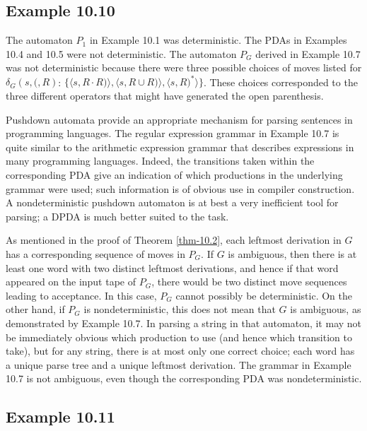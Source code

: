 \subsection*{Example 10.10}

The automaton $P_1$ in Example 10.1 was deterministic. The PDAs in Examples 10.4
and 10.5 were not deterministic. The automaton $P_G$ derived in Example 10.7 was
not deterministic because there were three possible choices of moves listed
for $\delta_G(s,\pmb{(}, R)$: $\{\langle s,R\cdot R\pmb{)}\rangle,\langle s,R
\cup R\pmb{)}\rangle,\langle s,R\pmb{)^*}\rangle\}$. These choices corresponded
to the three different operators that might have generated the open parenthesis.

Pushdown automata provide an appropriate mechanism for parsing sentences in
programming languages. The regular expression grammar in Example 10.7 is quite
similar to the arithmetic expression grammar that describes expressions in many
programming languages. Indeed, the transitions taken within the corresponding
PDA give an indication of which productions in the underlying grammar were used;
such information is of obvious use in compiler construction. A nondeterministic
pushdown automaton is at best a very inefficient tool for parsing; a DPDA is
much better suited to the task.

As mentioned in the proof of Theorem \ref{thm-10.2}, each leftmost derivation in $G$ has
a corresponding sequence of moves in $P_G$. If $G$ is ambiguous, then there is at
least one word with two distinct leftmost derivations, and hence if that word
appeared on the input tape of $P_G$, there would be two distinct move sequences
leading to acceptance. In this case, $P_G$ cannot possibly be deterministic. On
the other hand, if $P_G$ is nondeterministic, this does not mean that $G$ is
ambiguous, as demonstrated by Example 10.7. In parsing a string in that
automaton, it may not be immediately obvious which production to use (and hence
which transition to take), but for any string, there is at most only one correct
choice; each word has a unique parse tree and a unique leftmost derivation. The
grammar in Example 10.7 is not ambiguous, even though the corresponding PDA was
nondeterministic.

\subsection*{Example 10.11}

